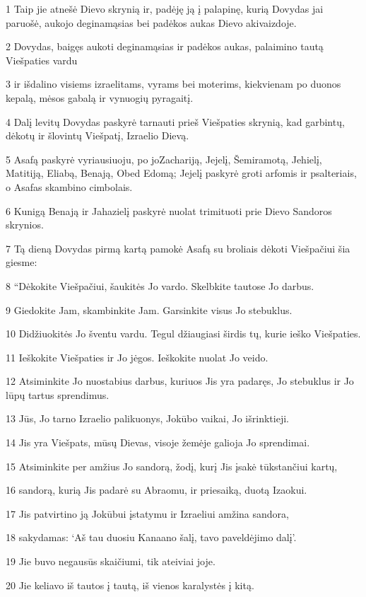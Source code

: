 \par 1 Taip jie atnešė Dievo skrynią ir, padėję ją į palapinę, kurią Dovydas jai paruošė, aukojo deginamąsias bei padėkos aukas Dievo akivaizdoje. 
\par 2 Dovydas, baigęs aukoti deginamąsias ir padėkos aukas, palaimino tautą Viešpaties vardu 
\par 3 ir išdalino visiems izraelitams, vyrams bei moterims, kiekvienam po duonos kepalą, mėsos gabalą ir vynuogių pyragaitį. 
\par 4 Dalį levitų Dovydas paskyrė tarnauti prieš Viešpaties skrynią, kad garbintų, dėkotų ir šlovintų Viešpatį, Izraelio Dievą. 
\par 5 Asafą paskyrė vyriausiuoju, po jo­Zachariją, Jejelį, Šemiramotą, Jehielį, Matitiją, Eliabą, Benają, Obed Edomą; Jejelį paskyrė groti arfomis ir psalteriais, o Asafas skambino cimbolais. 
\par 6 Kunigą Benają ir Jahazielį paskyrė nuolat trimituoti prie Dievo Sandoros skrynios. 
\par 7 Tą dieną Dovydas pirmą kartą pamokė Asafą su broliais dėkoti Viešpačiui šia giesme: 
\par 8 “Dėkokite Viešpačiui, šaukitės Jo vardo. Skelbkite tautose Jo darbus. 
\par 9 Giedokite Jam, skambinkite Jam. Garsinkite visus Jo stebuklus. 
\par 10 Didžiuokitės Jo šventu vardu. Tegul džiaugiasi širdis tų, kurie ieško Viešpaties. 
\par 11 Ieškokite Viešpaties ir Jo jėgos. Ieškokite nuolat Jo veido. 
\par 12 Atsiminkite Jo nuostabius darbus, kuriuos Jis yra padaręs, Jo stebuklus ir Jo lūpų tartus sprendimus. 
\par 13 Jūs, Jo tarno Izraelio palikuonys, Jokūbo vaikai, Jo išrinktieji. 
\par 14 Jis yra Viešpats, mūsų Dievas, visoje žemėje galioja Jo sprendimai. 
\par 15 Atsiminkite per amžius Jo sandorą, žodį, kurį Jis įsakė tūkstančiui kartų, 
\par 16 sandorą, kurią Jis padarė su Abraomu, ir priesaiką, duotą Izaokui. 
\par 17 Jis patvirtino ją Jokūbui įstatymu ir Izraeliui amžina sandora, 
\par 18 sakydamas: ‘Aš tau duosiu Kanaano šalį, tavo paveldėjimo dalį’. 
\par 19 Jie buvo negausūs skaičiumi, tik ateiviai joje. 
\par 20 Jie keliavo iš tautos į tautą, iš vienos karalystės į kitą. 
